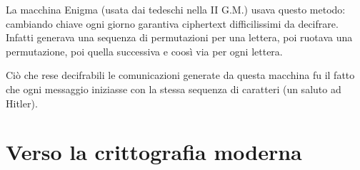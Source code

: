 \documentclass[a4paper, 11pt]{article}
\begin{document}
	La macchina Enigma (usata dai tedeschi nella II G.M.) usava questo metodo: cambiando chiave ogni giorno garantiva ciphertext difficilissimi da decifrare. Infatti generava una sequenza di permutazioni per una lettera, poi ruotava una permutazione, poi quella successiva e coosì via per ogni lettera.
	
	Ciò che rese decifrabili le comunicazioni generate da questa macchina fu il fatto che ogni messaggio iniziasse con la stessa sequenza di caratteri (un saluto ad Hitler).
	
	\section{Verso la crittografia moderna}
	
	
	
\end{document}
